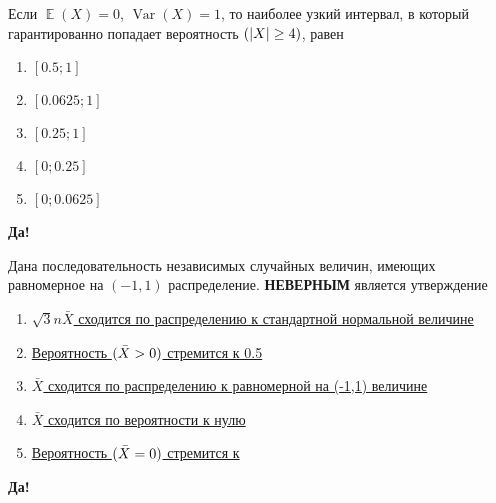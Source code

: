 \documentclass[t]{beamer}
\DeclareMathOperator{\Var}{Var}
\DeclareMathOperator{\E}{\mathbb{E}}
\let\P\relax
\DeclareMathOperator{\P}{\mathbb{P}}
\begin{document}
 \begin{frame} \label{28-Yes} 
\begin{block}{28} 

Если $\E(X)=0$, $\Var(X)=1$, то наиболее узкий интервал, в который гарантированно попадает вероятность $\P(|X| \geq 4)$, равен


 \end{block} 
\begin{enumerate} 
\item[] \hyperlink{28-No}{\beamergotobutton{} $[0.5; 1]$
}
\item[] \hyperlink{28-No}{\beamergotobutton{} $[0.0625; 1]$}
\item[] \hyperlink{28-No}{\beamergotobutton{} $[0.25; 1]$}
\item[] \hyperlink{28-No}{\beamergotobutton{} $[0; 0.25]$}
\item[] \hyperlink{28-Yes}{\beamergotobutton{} $[0; 0.0625]$ }
\end{enumerate} 

 \textbf{Да!} 
 \hyperlink{29}{}\end{frame} 


 \begin{frame} \label{29-Yes} 
\begin{block}{29} 


Дана последовательность независимых случайных величин, имеющих равномерное на $(-1,1)$ распределение.  \textbf{НЕВЕРНЫМ} является утверждение
 


 \end{block} 
\begin{enumerate} 
\item[] \hyperlink{29-No}{\beamergotobutton{} 	$\sqrt3n\bar X$ сходится по распределению к стандартной нормальной величине}
\item[] \hyperlink{29-No}{\beamergotobutton{} Вероятность	$\P(\bar X>0)$ стремится к 0.5}
\item[] \hyperlink{29-Yes}{\beamergotobutton{}   $\bar X$ сходится по распределению к равномерной на (-1,1) величине }
\item[] \hyperlink{29-No}{\beamergotobutton{} $\bar X$ сходится по вероятности к нулю}
\item[] \hyperlink{29-No}{\beamergotobutton{} Вероятность	$\P(\bar X = 0)$ стремится к}
\end{enumerate} 

 \textbf{Да!} 
 \hyperlink{30}{}\end{frame} 
\end{document}
